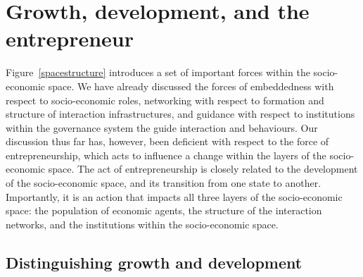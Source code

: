 \section{Growth, development, and the entrepreneur}
\label{subsec:growthdev}

Figure~\ref{spacestructure} introduces a set of important forces within the socio-economic space. We have already discussed the forces of embeddedness with respect to socio-economic roles, networking with respect to formation and structure of interaction infrastructures, and guidance with respect to institutions within the governance system the guide interaction and behaviours. Our discussion thus far has, however, been deficient with respect to the force of entrepreneurship, which acts to influence a change within the layers of the socio-economic space. The act of entrepreneurship is closely related to the development of the socio-economic space, and its transition from one state to another. Importantly, it is an action that impacts all three layers of the socio-economic space: the population of economic agents, the structure of the interaction networks, and the institutions within the socio-economic space.

\subsection{Distinguishing growth and development}

